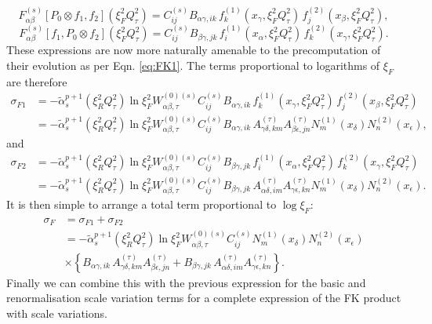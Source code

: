 \documentclass[11pt]{article}
\newcommand{\be}{\begin{equation}}
\newcommand{\ee}{\end{equation}}
\begin{document}
\be \label{eq:deconvsubprocess1} F^{(s)}_{\alpha\beta}[P_0\otimes f_1, f_2](\xi_F^2{Q^2_\tau})= C^{(s)}_{ij} B_{\alpha\gamma, ik} \, 
 f_k^{(1)}(x_\gamma, \xi_F^2Q_\tau^2)\, f_j^{(2)}(x_{\beta},\xi_F^2Q^2_\tau), \ee
\be \label{eq:deconvsubprocess1} F^{(s)}_{\alpha\beta}[f_1, P_0\otimes f_2](\xi_F^2{Q^2_\tau})= C^{(s)}_{ij} B_{\beta\gamma, jk} \, 
 f_i^{(1)}(x_\alpha, \xi_F^2Q_\tau^2)\, f_k^{(2)}(x_{\gamma},\xi_F^2Q^2_\tau). \ee
 These expressions are now more naturally amenable to the precomputation of their evolution as per Eqn. \ref{eq:FK1}. The terms proportional to logarithms of $\xi_F$ are therefore 
 \begin{align}
\sigma_{F1} &=
-\tilde{\alpha}_s^{p+1}(\xi_R^2Q^2_\tau)
\ln \xi_F^2  
W_{\alpha\beta,\tau}^{(0)(s)} C^{(s)}_{ij} B_{\alpha\gamma, ik} \, 
 f_k^{(1)}(x_\gamma, \xi_F^2Q_\tau^2)\, f_j^{(2)}(x_{\beta},\xi_F^2Q^2_\tau) \nonumber \\
 &=
 -\tilde{\alpha}_s^{p+1}(\xi_R^2Q^2_\tau)
\ln \xi_F^2  
W_{\alpha\beta,\tau}^{(0)(s)} C^{(s)}_{ij} B_{\alpha\gamma, ik} \, 
A^{(\tau)}_{\gamma\delta, km} A^{(\tau)}_{\beta\epsilon, jn} N^{(1)}_{m}(x_\delta) N^{(2)}_{n}(x_\epsilon),
 \end{align}
and
\begin{align}
\sigma_{F2} &=
-\tilde{\alpha}_s^{p+1}(\xi_R^2Q^2_\tau) \ln \xi_F^2  
W_{\alpha\beta,\tau}^{(0)(s)} C^{(s)}_{ij} B_{\beta\gamma, jk} \, 
 f_i^{(1)}(x_\alpha, \xi_F^2Q_\tau^2)\, f_k^{(2)}(x_{\gamma},\xi_F^2Q^2_\tau) \nonumber \\
 &=
-\tilde{\alpha}_s^{p+1}(\xi_R^2Q^2_\tau) \ln \xi_F^2  
W_{\alpha\beta,\tau}^{(0)(s)} C^{(s)}_{ij} B_{\beta\gamma, jk} \, 
A^{(\tau)}_{\alpha\delta, im} A^{(\tau)}_{\gamma\epsilon, kn} N^{(1)}_{m}(x_\delta) N^{(2)}_{n}(x_\epsilon).
\end{align}
It is then simple to arrange a total term proportional to $\log \xi_F$:
\begin{align}
\sigma_F &= \sigma_{F1} + \sigma_{F2}\nonumber\\
&= -\tilde{\alpha}_s^{p+1}(\xi_R^2Q^2_\tau) \ln \xi_F^2  W_{\alpha\beta,\tau}^{(0)(s)} C^{(s)}_{ij} N^{(1)}_{m}(x_\delta) N^{(2)}_{n}(x_\epsilon) \nonumber\\
&\times \left\{ B_{\alpha\gamma, ik} \, 
A^{(\tau)}_{\gamma\delta, km} A^{(\tau)}_{\beta\epsilon, jn} +  B_{\beta\gamma, jk} \, 
A^{(\tau)}_{\alpha\delta, im} A^{(\tau)}_{\gamma\epsilon, kn}  \right\}.
\end{align}
Finally we can combine this with the previous expression for the basic and renormalisation scale variation terms for a complete expression of the FK product with scale variations.
\end{document}
